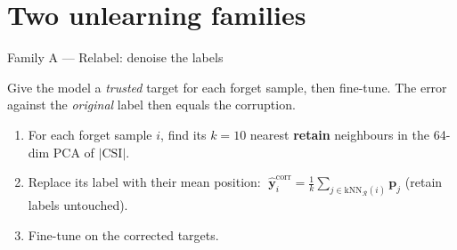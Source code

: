 \documentclass[10pt]{beamer}
\newcommand{\Rset}{\mathcal{R}}           %
\newcommand{\yi}{\mathbf{y}_i}            %
\newcommand{\ycorr}{\hat{\mathbf{y}}^{\mathrm{corr}}}   %
\DeclarePairedDelimiter{\norm}{\lVert}{\rVert}
\begin{document}




\section{Two unlearning families}

\begin{frame}{Family A --- Relabel: denoise the labels}

Give the model a \emph{trusted} target for each forget sample, then
fine-tune. The error against the \emph{original} label then equals the corruption.

\medskip
\begin{enumerate}
  \item For each forget sample $i$, find its $k=10$ nearest \textbf{retain} neighbours
    in the 64-dim PCA of $|\mathrm{CSI}|$.
  \item Replace its label with their mean position:
    $\;\ycorr_i = \frac{1}{k}\sum_{j\in\mathrm{kNN}_\Rset(i)} \mathbf{p}_j$
    \quad(retain labels untouched).
  \item Fine-tune on the corrected targets.
\end{enumerate}



\end{frame}
\end{document}
